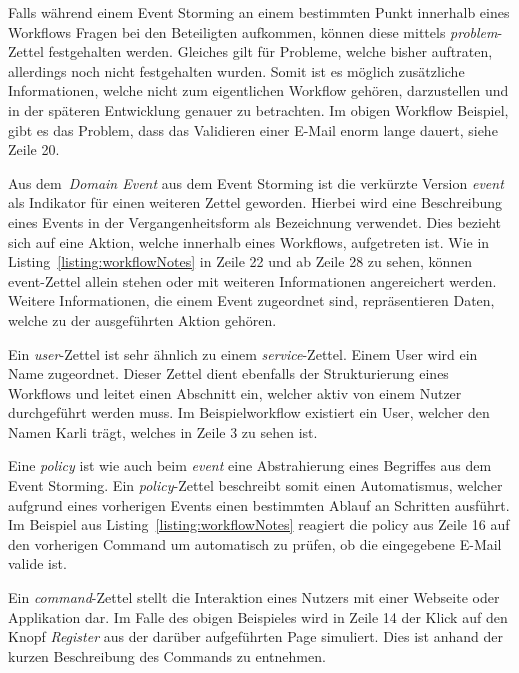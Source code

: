 
Falls während einem Event Storming an einem bestimmten Punkt innerhalb eines Workflows Fragen bei den Beteiligten aufkommen,
können diese mittels \textit{problem}-Zettel festgehalten werden.
Gleiches gilt für Probleme, welche bisher auftraten, allerdings noch nicht festgehalten wurden.
Somit ist es möglich zusätzliche Informationen, welche nicht zum eigentlichen Workflow gehören, darzustellen und in der
späteren Entwicklung genauer zu betrachten.
Im obigen Workflow Beispiel, gibt es das Problem, dass das Validieren einer E-Mail enorm lange dauert, siehe Zeile 20.


Aus dem~\textit{Domain Event} aus dem Event Storming ist die verkürzte Version \textit{event} als Indikator für einen weiteren Zettel geworden.
Hierbei wird eine Beschreibung eines Events in der Vergangenheitsform als Bezeichnung verwendet.
Dies bezieht sich auf eine Aktion, welche innerhalb eines Workflows, aufgetreten ist.
Wie in Listing~\ref{listing:workflowNotes} in Zeile 22 und ab Zeile 28 zu sehen, können event-Zettel allein stehen oder mit weiteren Informationen
angereichert werden.
Weitere Informationen, die einem Event zugeordnet sind, repräsentieren Daten, welche zu der ausgeführten Aktion gehören.


Ein \textit{user}-Zettel ist sehr ähnlich zu einem \textit{service}-Zettel.
Einem User wird ein Name zugeordnet.
Dieser Zettel dient ebenfalls der Strukturierung eines Workflows und leitet einen Abschnitt ein, welcher aktiv von einem
Nutzer durchgeführt werden muss.
Im Beispielworkflow existiert ein User, welcher den Namen Karli trägt, welches in Zeile 3 zu sehen ist.

Eine \textit{policy} ist wie auch beim \textit{event} eine Abstrahierung eines Begriffes aus dem Event Storming.
Ein \textit{policy}-Zettel beschreibt somit einen Automatismus, welcher aufgrund eines vorherigen Events einen bestimmten
Ablauf an Schritten ausführt.
Im Beispiel aus Listing~\ref{listing:workflowNotes} reagiert die policy aus Zeile 16 auf den vorherigen Command um automatisch zu prüfen,
ob die eingegebene E-Mail valide ist.


Ein \textit{command}-Zettel stellt die Interaktion eines Nutzers mit einer Webseite oder Applikation dar.
Im Falle des obigen Beispieles wird in Zeile 14 der Klick auf den Knopf \textit{Register} aus der darüber aufgeführten Page simuliert.
Dies ist anhand der kurzen Beschreibung des Commands zu entnehmen.

